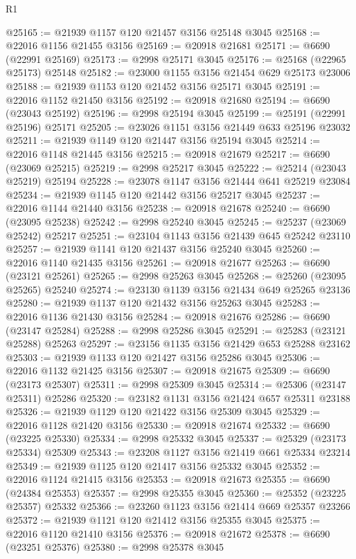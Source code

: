 \begin{lexlean}{R1}
\begin{coremodule}
@25165 := @21939 @1157 @120 @21457 @3156 @25148 @3045
@25168 := @22016 @1156 @21455 @3156
@25169 := @20918 @21681
@25171 := @6690 (@22991 @25169)
@25173 := @2998 @25171 @3045
@25176 := @25168 (@22965 @25173) @25148
@25182 := @23000 @1155 @3156 @21454 @629 @25173 @23006
@25188 := @21939 @1153 @120 @21452 @3156 @25171 @3045
@25191 := @22016 @1152 @21450 @3156
@25192 := @20918 @21680
@25194 := @6690 (@23043 @25192)
@25196 := @2998 @25194 @3045
@25199 := @25191 (@22991 @25196) @25171
@25205 := @23026 @1151 @3156 @21449 @633 @25196 @23032
@25211 := @21939 @1149 @120 @21447 @3156 @25194 @3045
@25214 := @22016 @1148 @21445 @3156
@25215 := @20918 @21679
@25217 := @6690 (@23069 @25215)
@25219 := @2998 @25217 @3045
@25222 := @25214 (@23043 @25219) @25194
@25228 := @23078 @1147 @3156 @21444 @641 @25219 @23084
@25234 := @21939 @1145 @120 @21442 @3156 @25217 @3045
@25237 := @22016 @1144 @21440 @3156
@25238 := @20918 @21678
@25240 := @6690 (@23095 @25238)
@25242 := @2998 @25240 @3045
@25245 := @25237 (@23069 @25242) @25217
@25251 := @23104 @1143 @3156 @21439 @645 @25242 @23110
@25257 := @21939 @1141 @120 @21437 @3156 @25240 @3045
@25260 := @22016 @1140 @21435 @3156
@25261 := @20918 @21677
@25263 := @6690 (@23121 @25261)
@25265 := @2998 @25263 @3045
@25268 := @25260 (@23095 @25265) @25240
@25274 := @23130 @1139 @3156 @21434 @649 @25265 @23136
@25280 := @21939 @1137 @120 @21432 @3156 @25263 @3045
@25283 := @22016 @1136 @21430 @3156
@25284 := @20918 @21676
@25286 := @6690 (@23147 @25284)
@25288 := @2998 @25286 @3045
@25291 := @25283 (@23121 @25288) @25263
@25297 := @23156 @1135 @3156 @21429 @653 @25288 @23162
@25303 := @21939 @1133 @120 @21427 @3156 @25286 @3045
@25306 := @22016 @1132 @21425 @3156
@25307 := @20918 @21675
@25309 := @6690 (@23173 @25307)
@25311 := @2998 @25309 @3045
@25314 := @25306 (@23147 @25311) @25286
@25320 := @23182 @1131 @3156 @21424 @657 @25311 @23188
@25326 := @21939 @1129 @120 @21422 @3156 @25309 @3045
@25329 := @22016 @1128 @21420 @3156
@25330 := @20918 @21674
@25332 := @6690 (@23225 @25330)
@25334 := @2998 @25332 @3045
@25337 := @25329 (@23173 @25334) @25309
@25343 := @23208 @1127 @3156 @21419 @661 @25334 @23214
@25349 := @21939 @1125 @120 @21417 @3156 @25332 @3045
@25352 := @22016 @1124 @21415 @3156
@25353 := @20918 @21673
@25355 := @6690 (@24384 @25353)
@25357 := @2998 @25355 @3045
@25360 := @25352 (@23225 @25357) @25332
@25366 := @23260 @1123 @3156 @21414 @669 @25357 @23266
@25372 := @21939 @1121 @120 @21412 @3156 @25355 @3045
@25375 := @22016 @1120 @21410 @3156
@25376 := @20918 @21672
@25378 := @6690 (@23251 @25376)
@25380 := @2998 @25378 @3045

\end{coremodule}
\end{lexlean}

